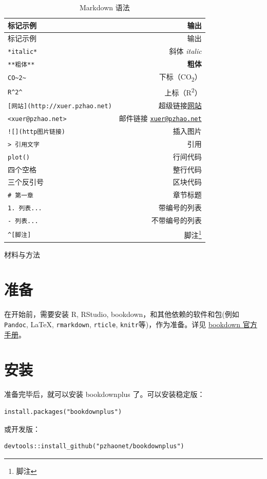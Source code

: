 \documentclass[UTF8, openany]{pkuthss}
\begin{document}
\begin{longtable}[]{@{}lr@{}}
\caption{\label{tab:md} Markdown 语法}\tabularnewline
\toprule
标记示例 & 输出\tabularnewline
\midrule
\endfirsthead
\toprule
标记示例 & 输出\tabularnewline
\midrule
\endhead
\texttt{*italic*} & 斜体 \emph{italic}\tabularnewline
\texttt{**粗体**} & \textbf{粗体}\tabularnewline
\texttt{CO\textasciitilde{}2\textasciitilde{}} & 下标（CO\textsubscript{2}）\tabularnewline
\texttt{R\^{}2\^{}} & 上标（R\textsuperscript{2}）\tabularnewline
\texttt{{[}网站{]}(http://xuer.pzhao.net)} & 超级链接\href{http://xuer.pzhao.net}{网站}\tabularnewline
\texttt{\textless{}xuer@pzhao.net\textgreater{}} & 邮件链接 \href{mailto:xuer@pzhao.net}{\nolinkurl{xuer@pzhao.net}}\tabularnewline
\texttt{!{[}{]}(http图片链接)} & 插入图片\tabularnewline
\texttt{\textgreater{}\ 引用文字} & 引用\tabularnewline
\texttt{\textasciigrave{}plot()\textasciigrave{}} & 行间代码\tabularnewline
四个空格 & 整行代码\tabularnewline
三个反引号 & 区块代码\tabularnewline
\texttt{\#\ 第一章} & 章节标题\tabularnewline
\texttt{1.\ 列表...} & 带编号的列表\tabularnewline
\texttt{-\ 列表...} & 不带编号的列表\tabularnewline
\texttt{\^{}{[}脚注{]}} & 脚注\footnote{脚注}\tabularnewline
\bottomrule
\end{longtable}

材料与方法

\hypertarget{section}{%
\section{准备}\label{section}}

在开始前，需要安装 R, RStudio, bookdown，和其他依赖的软件和包(例如 \texttt{Pandoc}, LaTeX, \texttt{rmarkdown}, \texttt{rticle}, \texttt{knitr}等)，作为准备。详见 \href{https://bookdown.org/yihui/bookdown/}{bookdown 官方手册}。

\hypertarget{section-1}{%
\section{安装}\label{section-1}}

准备完毕后，就可以安装 bookdownplus 了。可以安装稳定版：

\begin{verbatim}
install.packages("bookdownplus")
\end{verbatim}

或开发版：

\begin{verbatim}
devtools::install_github("pzhaonet/bookdownplus")
\end{verbatim}
\end{document}

